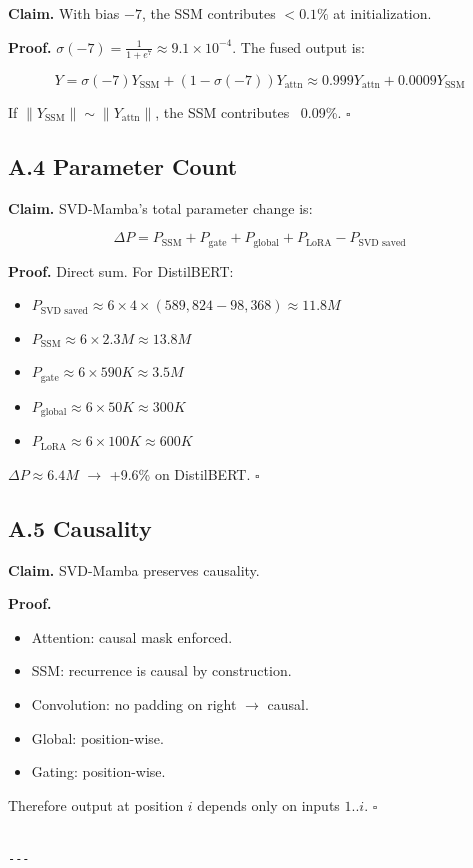 \textbf{Claim.} With bias $-7$, the SSM contributes $< 0.1\%$ at initialization.

\textbf{Proof.} $\sigma(-7) = \frac{1}{1 + e^7} \approx 9.1 \times 10^{-4}$. The 
fused output is:

\[
Y = \sigma(-7) Y_\text{SSM} + (1 - \sigma(-7)) Y_\text{attn} \approx 0.999 Y_\text{attn} + 0.0009 Y_\text{SSM}
\]

If $\|Y_\text{SSM}\| \sim \|Y_\text{attn}\|$, the SSM contributes ~0.09\%. $\square$

\subsection{A.4 Parameter Count}

\textbf{Claim.} SVD-Mamba's total parameter change is:

\[
\Delta P = P_\text{SSM} + P_\text{gate} + P_\text{global} + P_\text{LoRA} - P_\text{SVD saved}
\tag{A.2}
\]

\textbf{Proof.} Direct sum. For DistilBERT:

\begin{itemize}
\item $P_\text{SVD saved} \approx 6 \times 4 \times (589,824 - 98,368) \approx 11.8M$
\item $P_\text{SSM} \approx 6 \times 2.3M \approx 13.8M$
\item $P_\text{gate} \approx 6 \times 590K \approx 3.5M$
\item $P_\text{global} \approx 6 \times 50K \approx 300K$
\item $P_\text{LoRA} \approx 6 \times 100K \approx 600K$

\end{itemize}
$\Delta P \approx 6.4M$ $\to$ +9.6\% on DistilBERT. $\square$

\subsection{A.5 Causality}

\textbf{Claim.} SVD-Mamba preserves causality.

\textbf{Proof.} 
\begin{itemize}
\item Attention: causal mask enforced.
\item SSM: recurrence is causal by construction.
\item Convolution: no padding on right $\to$ causal.
\item Global: position-wise.
\item Gating: position-wise.

\end{itemize}
Therefore output at position $i$ depends only on inputs $1..i$. $\square$
\begin{lstlisting}

---
\end{lstlisting}


